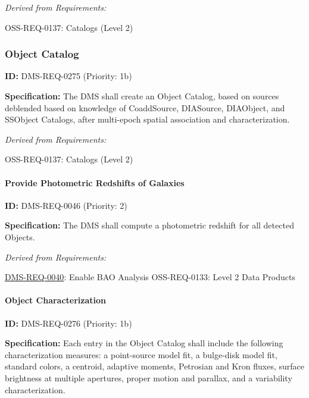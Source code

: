 \documentclass[SE,toc,lsstdraft]{lsstdoc}
\begin{document}
\emph{Derived from Requirements:}

OSS-REQ-0137:
Catalogs (Level 2) \newline

\subsubsection{Object Catalog}

\label{DMS-REQ-0275}
\textbf{ID:} DMS-REQ-0275 (Priority: 1b)

\textbf{Specification:} The DMS shall create an Object Catalog, based on sources deblended based on knowledge of CoaddSource, DIASource, DIAObject, and SSObject Catalogs, after multi-epoch spatial association and characterization.

\emph{Derived from Requirements:}

OSS-REQ-0137:
Catalogs (Level 2) \newline

\paragraph{Provide Photometric Redshifts of Galaxies}\hfill  %

\label{DMS-REQ-0046}
\textbf{ID:} DMS-REQ-0046 (Priority: 2)

\textbf{Specification:} The DMS shall compute a photometric redshift for all detected Objects.

\emph{Derived from Requirements:}

\hyperref[DMS-REQ-0040]{DMS-REQ-0040}:
Enable BAO Analysis \newline
OSS-REQ-0133:
Level 2 Data Products \newline

\paragraph{Object Characterization}\hfill  %

\label{DMS-REQ-0276}
\textbf{ID:} DMS-REQ-0276 (Priority: 1b)

\textbf{Specification:} Each entry in the Object Catalog shall include the following characterization measures: a point-source model fit, a bulge-disk model fit, standard colors, a centroid, adaptive moments, Petrosian and Kron fluxes, surface brightness at multiple apertures, proper motion and parallax, and a variability characterization.
\end{document}
